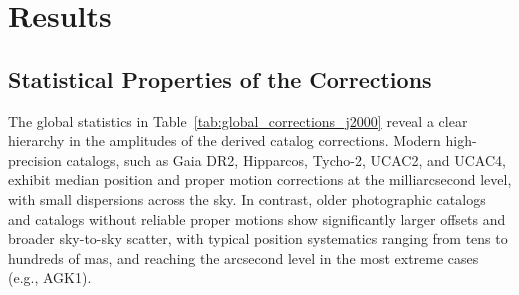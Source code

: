 \documentclass[linenumbers,amsmath,manuscript]{aastex702}
\begin{document}
\section{Results} \label{sec:results}

\subsection{Statistical Properties of the Corrections} \label{subsec:distribution}

The global statistics in Table~\ref{tab:global_corrections_j2000} reveal a clear hierarchy in the amplitudes of the derived catalog corrections. Modern high-precision catalogs, such as Gaia DR2, Hipparcos, Tycho-2, UCAC2, and UCAC4, exhibit median position and proper motion corrections at the milliarcsecond level, with small dispersions across the sky. In contrast, older photographic catalogs and catalogs without reliable proper motions show significantly larger offsets and broader sky-to-sky scatter, with typical position systematics ranging from tens to hundreds of mas, and reaching the arcsecond level in the most extreme cases (e.g., AGK1).
\end{document}
